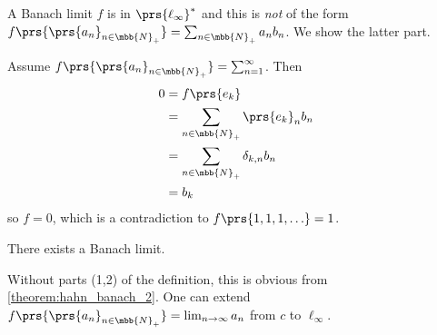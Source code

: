 \documentclass[10pt, twoside]{book}
\begin{document}
\begin{remark}
A Banach limit $f$ is in $\prs{\ell_\infty}^*$ and this is \emph{not} of the form $f\prs{\prs{a_n}_{n \in \mbb{N}_+}} = \sum_{n \in \mbb{N}_+} a_n b_n$. We show the latter part.

Assume $f\prs{\prs{a_n}_{n \in \mbb{N}_+}} = \sum_{n=1}^{\infty}$. Then
\begin{align*}
0 &= f\prs{e_k} \\&= \sum_{n \in \mbb{N}_+} \prs{e_k}_n b_n \\&= \sum_{n \in \mbb{N}_+} \delta_{k,n} b_n \\&= b_k
\end{align*}
so $f = 0$, which is a contradiction to $f\prs{1,1,1,\ldots} = 1$.
\end{remark}

\begin{theorem}
There exists a Banach limit.
\end{theorem}

\begin{remark}
Without parts (1,2) of the definition, this is obvious from \ref{theorem:hahn_banach_2}. One can extend $f\prs{\prs{a_n}_{n \in \mbb{N}_+}} = \lim_{n \to \infty} a_n$ from $c$ to $\ell_\infty$.
\end{remark}
\end{document}
